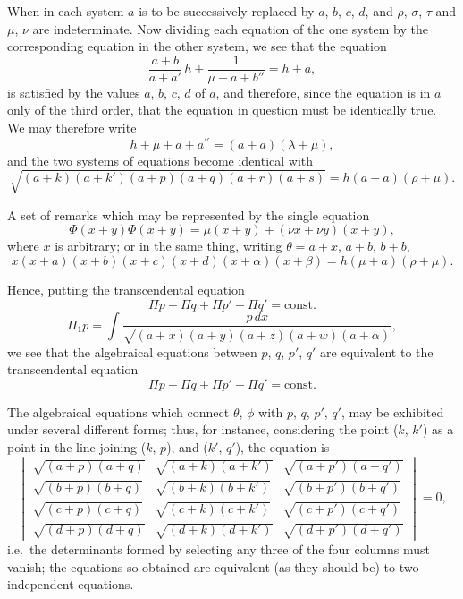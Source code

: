 \documentclass[11pt,a4paper]{book}
\begin{document}
\medskip

When in each system $a$ is to be successively replaced by $a$, $b$, $c$, $d$, and $\rho$, $\sigma$, $\tau$
and $\mu$, $\nu$ are indeterminate. Now dividing each equation of the one system by the
corresponding equation in the other system, we see that the equation
\[
\frac{a+b}{a+a'}\,h + \frac{1}{\mu+a+b''}=h+a,
\]
is satisfied by the values $a$, $b$, $c$, $d$ of $a$, and therefore, since the equation is in $a$
only of the third order, that the equation in question must be identically true. We
may therefore write
\[
h+\mu+a+a^{\prime\prime} =(a+a)(\lambda+\mu),
\]
and the two systems of equations become identical with
\[
\sqrt{(a+k)(a+k')(a+p)(a+q)(a+r)(a+s)} = h(a+a)(\rho+\mu).
\]

\medskip

\medskip
\noindent A set of remarks which may be represented by the single equation
\[
\Phi(x+y)\Phi(x+y) = \mu(x+y)+(\nu x+\nu y)(x+y),
\]
where $x$ is arbitrary; or in the same thing, writing $\theta = a + x$, $a + b$, $b + b$,
\[
x(x+a)(x+b)(x+c)(x+d)(x+\alpha)(x+\beta) = h(\mu+a)(\rho+\mu).
\]

\medskip

Hence, putting the
transcendental equation
\[
\Pi p + \Pi q + \Pi p' + \Pi q' = \mathrm{const.}
\]
\[
\Pi_1 p = \int \frac{p\,dx}{\sqrt{(a+x)(a+y)(a+z)(a+w)(a+\alpha)}},
\]
we see that the algebraical equations between $p$, $q$, $p'$, $q'$ are equivalent to the
transcendental equation
\[
\Pi p + \Pi q + \Pi p' + \Pi q' = \mathrm{const.}
\]

\medskip

The algebraical equations which connect $\theta$, $\phi$ with $p$, $q$, $p'$, $q'$, may be exhibited
under several different forms; thus, for instance, considering the point ($k$, $k'$) as
a point in the line joining ($k$, $p$), and ($k'$, $q'$), the equation is
\[
\begin{vmatrix}
\sqrt{(a+p)(a+q)} & \sqrt{(a+k)(a+k')} & \sqrt{(a+p')(a+q')} \\
\sqrt{(b+p)(b+q)} & \sqrt{(b+k)(b+k')} & \sqrt{(b+p')(b+q')} \\
\sqrt{(c+p)(c+q)} & \sqrt{(c+k)(c+k')} & \sqrt{(c+p')(c+q')} \\
\sqrt{(d+p)(d+q)} & \sqrt{(d+k)(d+k')} & \sqrt{(d+p')(d+q')}
\end{vmatrix} = 0,
\]
i.e.\ the determinants formed by selecting any three of the four columns must vanish;
the equations so obtained are equivalent (as they should be) to two independent
equations.
\end{document}
